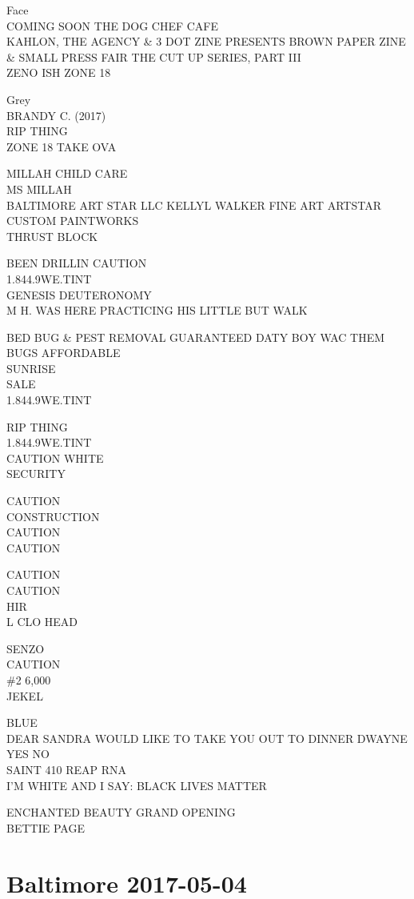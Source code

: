 \documentclass[10pt,letterpaper]{article}
\begin{document}
Face\\
COMING SOON THE DOG CHEF CAFE\\
KAHLON, THE AGENCY \& 3 DOT ZINE PRESENTS BROWN PAPER ZINE \& SMALL PRESS FAIR THE CUT UP SERIES, PART III\\
ZENO ISH ZONE 18

Grey\\
BRANDY C. (2017)\\
RIP THING\\
ZONE 18 TAKE OVA

MILLAH CHILD CARE\\
MS MILLAH\\
BALTIMORE ART STAR LLC KELLYL WALKER FINE ART ARTSTAR CUSTOM PAINTWORKS\\
THRUST BLOCK

BEEN DRILLIN CAUTION\\
1.844.9WE.TINT\\
GENESIS DEUTERONOMY\\
M H. WAS HERE PRACTICING HIS LITTLE BUT WALK

BED BUG \& PEST REMOVAL GUARANTEED DATY BOY WAC THEM BUGS AFFORDABLE\\
SUNRISE\\
SALE\\
1.844.9WE.TINT

RIP THING\\
1.844.9WE.TINT\\
CAUTION WHITE\\
SECURITY

CAUTION\\
CONSTRUCTION\\
CAUTION\\
CAUTION

CAUTION\\
CAUTION\\
HIR\\
L CLO HEAD

SENZO\\
CAUTION\\
\#2 6,000\\
JEKEL

BLUE\\
DEAR SANDRA WOULD LIKE TO TAKE YOU OUT TO DINNER DWAYNE YES NO\\
SAINT 410 REAP RNA\\
I'M WHITE AND I SAY: BLACK LIVES MATTER

ENCHANTED BEAUTY GRAND OPENING\\
BETTIE PAGE


\section*{Baltimore 2017-05-04}
\end{document}

